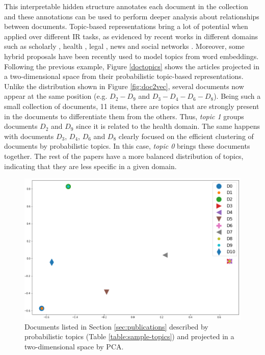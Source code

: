 This interpretable hidden structure annotates each document in the collection and these annotations can be used to perform deeper analysis about relationships between documents. Topic-based representations bring a lot of potential when applied over different IR tasks, as evidenced by recent works in different domains such as scholarly  \citep{Gatti2015}, health \citep{Lu2016, TapiNzali2017}, legal \citep{ONeill2017, Greene2016}, news \citep{He2017} and social networks \citep{Cheng2014a}. Moreover, some hybrid proposals have been recently used to model topics from word embeddings\citep{Dieng2020TopicMI}. Following the previous example, Figure \ref{doctopics} shows the articles projected in a two-dimensional space from their probabilistic topic-based representations. Unlike the distribution shown in Figure \ref{fig:doc2vec}, several documents now appear at the same position (e.g. $D_2-D_9$ and $D_3-D_4-D_6-D_8$). Being such a small collection of documents, 11 items, there are topics that are strongly present in the documents to differentiate them from the others. Thus, \textit{topic 1} groups documents $D_2$ and $D_9$ since it is related to the health domain. The same happens with documents $D_3$, $D_4$, $D_6$ and $D_8$ clearly focused on the efficient clustering of documents by probabilistic topics. In this case, \textit{topic 0} brings these documents together. The rest of the papers have a more balanced distribution of topics, indicating that they are less specific in a given domain.

\begin{figure}[!htbp]
\centering
\includegraphics[scale=0.34]{doctopics.png}
\caption{Documents listed in Section \ref{sec:publications} described by probabilistic topics (Table \ref{table:sample-topics}) and projected in a two-dimensional space by PCA. }
\label{fig:doctopics}
\end{figure}

